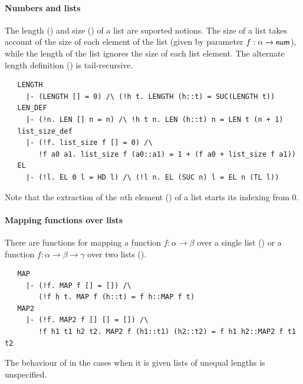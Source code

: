 \paragraph {Numbers and lists}

The length () and size () of a list
are suported notions. The size of a list takes account of the size of
each element of the list (given by parameter
$f:\alpha\to\mbox{\small{\textbf{\sf{num}}}}$), while the length of the list ignores the
size of each list element. The alternate length definition
() is tail-recursive.
%
\begin{hol}
\begin{verbatim}
   LENGTH
     |- (LENGTH [] = 0) /\ (!h t. LENGTH (h::t) = SUC(LENGTH t))
   LEN_DEF
     |- (!n. LEN [] n = n) /\ !h t n. LEN (h::t) n = LEN t (n + 1)
   list_size_def
     |- (!f. list_size f [] = 0) /\
        !f a0 a1. list_size f (a0::a1) = 1 + (f a0 + list_size f a1))
   EL
     |- (!l. EL 0 l = HD l) /\ (!l n. EL (SUC n) l = EL n (TL l))
\end{verbatim}
\end{hol}

\noindent
Note that the extraction of the $n$th element () of a
list starts its indexing from 0.

\paragraph {Mapping functions over lists}

There are functions for mapping a function $f : \alpha \to \beta$ over
a single list (\holtxt{MAP}) or a function $f : \alpha \to \beta
\to \gamma$ over two lists (\holtxt{MAP2}).
\begin{hol}
\begin{verbatim}
   MAP
     |- (!f. MAP f [] = []) /\
        (!f h t. MAP f (h::t) = f h::MAP f t)
   MAP2
     |- (!f. MAP2 f [] [] = []) /\
        !f h1 t1 h2 t2. MAP2 f (h1::t1) (h2::t2) = f h1 h2::MAP2 f t1 t2
\end{verbatim}
\end{hol}
The behaviour of \holtxt{MAP2} in the cases when it is given lists of
unequal lengths is unspecified.

